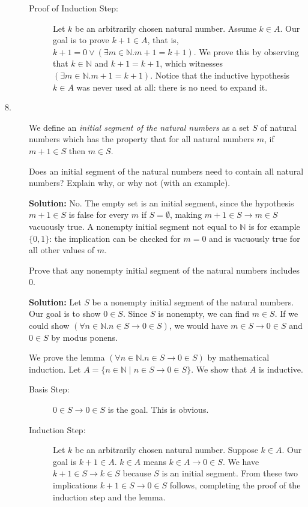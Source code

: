 \documentclass[12pt]{book}
\begin{document}
\begin{description}
\begin{description}
\item[Proof of Induction Step:] Let $k$ be an arbitrarily chosen
natural number.  Assume $k \in A$.  Our goal is to prove $k+1 \in A$,
that is, $k+1=0 \vee (\exists m \in {\mathbb N}.m+1=k+1)$.  We prove
this by observing that $k \in {\mathbb N}$ and $k+1=k+1$, which
witnesses $(\exists m \in {\mathbb N}.m+1=k+1)$.  Notice that the
inductive hypothesis $k \in A$ was never used at all: there is no need
to expand it.

\end{description}

\newpage

\item[8.]  We define an {\em initial segment of the natural numbers\/} as a set
$S$ of natural numbers which has the property that for all natural
numbers $m$, if $m+1 \in S$ then $m \in S$.

Does an initial segment of the natural numbers need to contain all
natural numbers?  Explain why, or why not (with an example).

{\bf Solution:} No.  The empty set is an initial segment, since the
hypothesis $m +1 \in S$ is false for every $m$ if $S = \emptyset$,
making $m+1 \in S \rightarrow m \in S$ vacuously true.  A nonempty
initial segment not equal to $\mathbb N$ is for example $\{0,1\}$: the
implication can be checked for $m=0$ and is vacuously true for all
other values of $m$.

Prove that any nonempty initial segment of the natural numbers includes 0.

{\bf Solution:} Let $S$ be a nonempty initial segment of the natural
numbers.  Our goal is to show $0 \in S$.  Since $S$ is nonempty, we
can find $m \in S$.  If we could show $(\forall n \in {\mathbb N}.n
\in S \rightarrow 0 \in S)$, we would have $m \in S \rightarrow 0 \in
S$ and $0 \in S$ by modus ponens.

We prove the lemma $(\forall n \in {\mathbb N}.n \in S \rightarrow 0
\in S)$ by mathematical induction.  Let $A = \{n \in {\mathbb N} \mid
n \in S \rightarrow 0 \in S\}$.  We show that $A$ is inductive.

\begin{description}

\item [Basis Step:]  $0 \in S \rightarrow 0 \in S$ is the goal.  This is obvious.

\item[Induction Step:] Let $k$ be an arbitrarily chosen natural
number.  Suppose $k \in A$.  Our goal is $k+1 \in A$.  $k \in A$ means
$k \in A \rightarrow 0 \in S$.  We have $k+1 \in S \rightarrow k \in
S$ because $S$ is an initial segment.  From these two implications
$k+1 \in S \rightarrow 0 \in S$ follows, completing the proof of the
induction step and the lemma.

\end{description}


\newpage

\end{description}
\end{document}
